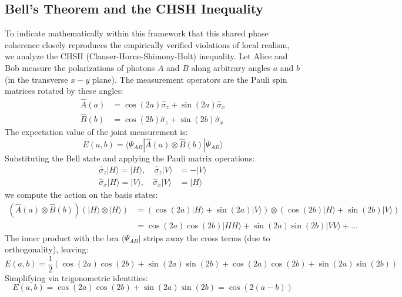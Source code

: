 \subsection{Bell's Theorem and the CHSH Inequality}
To indicate mathematically within this framework that this shared phase coherence closely reproduces the empirically verified violations of local realism, we analyze the CHSH (Clauser-Horne-Shimony-Holt) inequality. 
Let Alice and Bob measure the polarizations of photons $A$ and $B$ along arbitrary angles $a$ and $b$ (in the transverse $x-y$ plane). The measurement operators are the Pauli spin matrices rotated by these angles:
\begin{align}
\hat{A}(a) &= \cos(2a)\hat{\sigma}_z + \sin(2a)\hat{\sigma}_x \\
\hat{B}(b) &= \cos(2b)\hat{\sigma}_z + \sin(2b)\hat{\sigma}_x
\end{align}
The expectation value of the joint measurement is:
\begin{equation}
E(a,b) = \langle \Psi_{AB} | \hat{A}(a) \otimes \hat{B}(b) | \Psi_{AB} \rangle
\end{equation}
Substituting the Bell state and applying the Pauli matrix operations:
\begin{align}
\hat{\sigma}_z |H\rangle = |H\rangle, \quad \hat{\sigma}_z |V\rangle &= -|V\rangle \\
\hat{\sigma}_x |H\rangle = |V\rangle, \quad \hat{\sigma}_x |V\rangle &= |H\rangle
\end{align}
we compute the action on the basis states:
\begin{align}
(\hat{A}(a) \otimes \hat{B}(b)) (|H\rangle \otimes |H\rangle) &= (\cos(2a)|H\rangle + \sin(2a)|V\rangle) \otimes (\cos(2b)|H\rangle + \sin(2b)|V\rangle) \nonumber \\
&= \cos(2a)\cos(2b)|HH\rangle + \sin(2a)\sin(2b)|VV\rangle + \dots
\end{align}
The inner product with the bra $\langle \Psi_{AB} |$ strips away the cross terms (due to orthogonality), leaving:
\begin{equation}
E(a,b) = \frac{1}{2} \left( \cos(2a)\cos(2b) + \sin(2a)\sin(2b) + \cos(2a)\cos(2b) + \sin(2a)\sin(2b) \right)
\end{equation}
Simplifying via trigonometric identities:
\begin{equation}
E(a,b) = \cos(2a)\cos(2b) + \sin(2a)\sin(2b) = \cos(2(a-b))
\end{equation}

